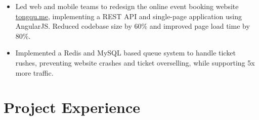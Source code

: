 \documentclass[11pt, letterpaper]{simple-cv}
\begin{document}


\begin{itemize}
	\item Led web and mobile teams to redesign the online event booking website \href{https://tongqu.me}{tongqu.me},
	implementing a REST API and single-page application using AngularJS.
	Reduced codebase size by 60\% and improved page load time by 80\%.
	\item Implemented a Redis and MySQL based queue system to handle ticket rushes, preventing website crashes and ticket overselling, while supporting 5x more traffic.
\end{itemize}

\section{Project Experience}

\end{document}
